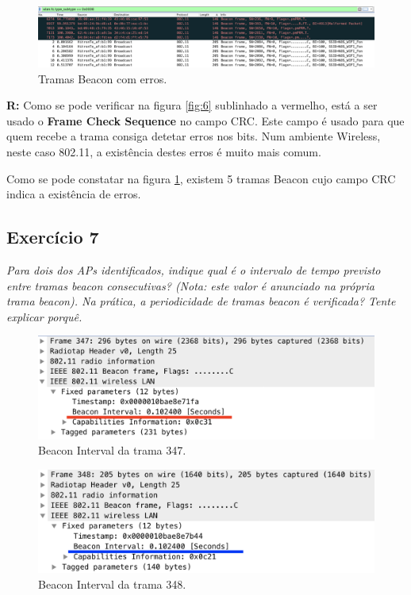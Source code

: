\documentclass{llncs}
\begin{document}
\begin{figure}[H]
\begin{center}
\includegraphics[scale=0.30]{6_2.png} 
\end{center}
\caption{\label{fig:6_2} Tramas Beacon com erros.}
\end{figure} 
\par
\textbf{R:} Como se pode verificar na figura \ref{fig:6} sublinhado a vermelho, está a ser usado o \textbf{Frame Check Sequence} no campo CRC. Este campo é usado para que quem recebe a trama consiga detetar erros nos bits. Num ambiente Wireless, neste caso 802.11, a existência destes erros é muito mais comum.

Como se pode constatar na figura \ref{fig:6_2}, existem 5 tramas Beacon cujo campo CRC indica a existência de erros.


\subsection{Exercício 7}
\emph{Para dois dos APs identificados, indique qual é o intervalo de tempo previsto entre tramas beacon consecutivas? (Nota: este valor é anunciado na própria trama beacon). Na prática, a periodicidade de tramas beacon é verificada? Tente explicar porquê.}
\begin{figure}[H]
\begin{center}
\includegraphics[scale=0.30]{7_347.png} 
\end{center}
\caption{\label{fig:7_347} Beacon Interval da trama 347.}
\end{figure} 
\par
\begin{figure}[H]
\begin{center}
\includegraphics[scale=0.30]{7_348.png} 
\end{center}
\caption{\label{fig:7_348}Beacon Interval da trama 348.}
\end{figure} 
\end{document}
